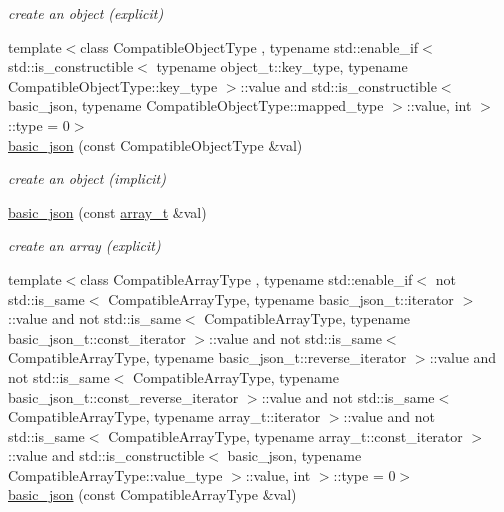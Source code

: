 \begin{DoxyCompactItemize}
\begin{DoxyCompactList}\small\item\em create an object (explicit) \end{DoxyCompactList}\item 
{\footnotesize template$<$class Compatible\+Object\+Type , typename std\+::enable\+\_\+if$<$                                                              std\+::is\+\_\+constructible$<$ typename object\+\_\+t\+::key\+\_\+type, typename Compatible\+Object\+Type\+::key\+\_\+type $>$\+::value and                                                           std\+::is\+\_\+constructible$<$ basic\+\_\+json, typename Compatible\+Object\+Type\+::mapped\+\_\+type $>$\+::value, int $>$\+::type  = 0$>$ }\\\hyperlink{classnlohmann_1_1basic__json_ab7be2bc58ae0c2c2c30d40f15d6399f8}{basic\+\_\+json} (const Compatible\+Object\+Type \&val)
\begin{DoxyCompactList}\small\item\em create an object (implicit) \end{DoxyCompactList}\item 
\hyperlink{classnlohmann_1_1basic__json_a3aaf41d385f0d9a93deb92f9b14ae0cf}{basic\+\_\+json} (const \hyperlink{classnlohmann_1_1basic__json_ab00b882d39306d663c23dab110f5cae0}{array\+\_\+t} \&val)
\begin{DoxyCompactList}\small\item\em create an array (explicit) \end{DoxyCompactList}\item 
{\footnotesize template$<$class Compatible\+Array\+Type , typename std\+::enable\+\_\+if$<$                                                              not std\+::is\+\_\+same$<$ Compatible\+Array\+Type, typename basic\+\_\+json\+\_\+t\+::iterator $>$\+::value and                                                           not std\+::is\+\_\+same$<$ Compatible\+Array\+Type, typename basic\+\_\+json\+\_\+t\+::const\+\_\+iterator $>$\+::value and                                                           not std\+::is\+\_\+same$<$ Compatible\+Array\+Type, typename basic\+\_\+json\+\_\+t\+::reverse\+\_\+iterator $>$\+::value and                                                           not std\+::is\+\_\+same$<$ Compatible\+Array\+Type, typename basic\+\_\+json\+\_\+t\+::const\+\_\+reverse\+\_\+iterator $>$\+::value and                                                           not std\+::is\+\_\+same$<$ Compatible\+Array\+Type, typename array\+\_\+t\+::iterator $>$\+::value and                                                           not std\+::is\+\_\+same$<$ Compatible\+Array\+Type, typename array\+\_\+t\+::const\+\_\+iterator $>$\+::value and                                                           std\+::is\+\_\+constructible$<$ basic\+\_\+json, typename Compatible\+Array\+Type\+::value\+\_\+type $>$\+::value, int $>$\+::type  = 0$>$ }\\\hyperlink{classnlohmann_1_1basic__json_a81aaaab0f3b326afda2d226daab4f1e1}{basic\+\_\+json} (const Compatible\+Array\+Type \&val)

\end{DoxyCompactItemize}
